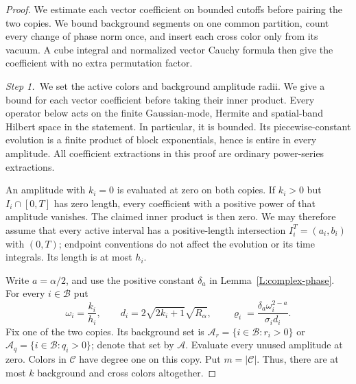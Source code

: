 \documentclass[12pt,oneside,openany]{book}
\numberwithin{equation}{section}
\theoremstyle{nogostyle}
\theoremstyle{definition}
\begin{document}
\begin{proof}
  We estimate each vector coefficient on bounded cutoffs before pairing the
  two copies. We bound background segments on one common partition, count
  every change of phase norm once, and insert each cross color only from its
  vacuum. A cube integral and normalized vector Cauchy formula then give the
  coefficient with no extra permutation factor.


  \medskip
  \noindent\textit{Step 1.~}We set the active colors and background amplitude
  radii.
  We give a bound for each vector coefficient before taking their inner product.
  Every operator below acts on the finite Gaussian-mode, Hermite and
  spatial-band Hilbert space in the statement. In particular, it is bounded. Its
  piecewise-constant evolution is a finite product of block exponentials, hence
  is entire in every amplitude. All coefficient extractions in this proof are
  ordinary power-series extractions.

  An amplitude with $k_i = 0$ is evaluated at zero on both copies. If $k_i > 0$
  but $I_i\cap[0,T]$ has zero length, every coefficient with a positive power of
  that amplitude vanishes. The claimed inner product is then zero. We may
  therefore assume that every active interval has a positive-length intersection
  $I_i^T = (a_i,b_i)$ with $(0,T)$; endpoint conventions do not affect the
  evolution or its time integrals. Its length is at most $h_i$.

  Write $a = \alpha/2$, and use the positive constant $\delta_a$ in
  Lemma~\ref{L:complex-phase}. For every $i \in \mathcal{B}$ put
  \begin{equation}\label{E:split-radii}
    \omega_i=\frac{k_i}{h_i},\qquad
    d_i=2\sqrt{2k_i+1}\sqrt{R_\alpha},\qquad
    \varrho_i=\frac{\delta_a\omega_i^{2-a}}{\sigma_i d_i}.
  \end{equation}
  Fix one of the two copies. Its background set is $\mathcal{A}_r =
  \{i\in\mathcal{B}:r_i>0\}$ or $\mathcal{A}_q = \{i\in\mathcal{B}:q_i>0\}$;
  denote that set by $\mathcal{A}$. Evaluate every unused amplitude at zero.
  Colors in $\mathcal{C}$ have degree one on this copy. Put $m = |\mathcal{C}|$.
  Thus, there are at most $k$ background and cross colors altogether.



\end{proof}
\end{document}
